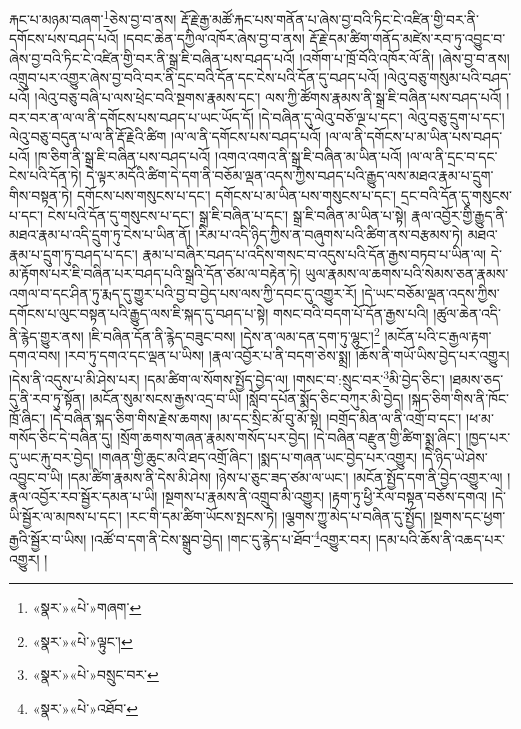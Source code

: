 རྐང་པ་མཉམ་བཞག་\footnote{«སྣར་»«པེ་»གཞག་}ཅེས་བྱ་བ་ནས། རྡོ་རྗེ་རྒྱ་མཚོ་རྐང་པས་གནོན་པ་ཞེས་བྱ་བའི་ཏིང་ངེ་འཛིན་གྱི་བར་ནི་དགོངས་པས་བཤད་པའོ། །དབང་ཆེན་དཀྱིལ་འཁོར་ཞེས་བྱ་བ་ནས། རྡོ་རྗེ་དམ་ཚིག་གནོད་མཛེས་རབ་ཏུ་འབྱུང་བ་ཞེས་བྱ་བའི་ཏིང་ངེ་འཛིན་གྱི་བར་ནི་སྒྲ་ཇི་བཞིན་པས་བཤད་པའོ། །འགོག་པ་ཁྲོ་བོའི་འཁོར་ལོ་ནི། །ཞེས་བྱ་བ་ནས། འགྲུབ་པར་འགྱུར་ཞེས་བྱ་བའི་བར་ནི་དྲང་བའི་དོན་དང་ངེས་པའི་དོན་དུ་བཤད་པའོ། །ལེའུ་བཅུ་གསུམ་པའི་བཤད་པའོ། །ལེའུ་བཅུ་བཞི་པ་ལས་ཕྲེང་བའི་སྔགས་རྣམས་དང་། ལས་ཀྱི་ཚོགས་རྣམས་ནི་སྒྲ་ཇི་བཞིན་པས་བཤད་པའོ། །བར་བར་ན་ལ་ལ་ནི་དགོངས་པས་བཤད་པ་ཡང་ཡོད་དོ། །དེ་བཞིན་དུ་ལེའུ་བཅོ་ལྔ་པ་དང་། ལེའུ་བཅུ་དྲུག་པ་དང་། ལེའུ་བཅུ་བདུན་པ་ལ་ནི་རྡོ་རྗེའི་ཚིག །ལ་ལ་ནི་དགོངས་པས་བཤད་པའོ། །ལ་ལ་ནི་དགོངས་པ་མ་ཡིན་པས་བཤད་པའོ། །ཁ་ཅིག་ནི་སྒྲ་ཇི་བཞིན་པས་བཤད་པའོ། །འགའ་འགའ་ནི་སྒྲ་ཇི་བཞིན་མ་ཡིན་པའོ། །ལ་ལ་ནི་དྲང་བ་དང་ངེས་པའི་དོན་ཏེ། དེ་ལྟར་མདོའི་ཚིག་དེ་དག་ནི་བཅོམ་ལྡན་འདས་ཀྱིས་བཤད་པའི་རྒྱུད་ལས་མཐའ་རྣམ་པ་དྲུག་གིས་བསྟན་ཏེ། དགོངས་པས་གསུངས་པ་དང་། དགོངས་པ་མ་ཡིན་པས་གསུངས་པ་དང་། དྲང་བའི་དོན་དུ་གསུངས་པ་དང་། ངེས་པའི་དོན་དུ་གསུངས་པ་དང་། སྒྲ་ཇི་བཞིན་པ་དང་། སྒྲ་ཇི་བཞིན་མ་ཡིན་པ་སྟེ། རྣལ་འབྱོར་གྱི་རྒྱུད་ནི་མཐའ་རྣམ་པ་འདི་དྲུག་ཏུ་ངེས་པ་ཡིན་ནོ། །རིམ་པ་འདི་ཉིད་ཀྱིས་ན་བཞུགས་པའི་ཚིག་ནས་བརྩམས་ཏེ། མཐའ་རྣམ་པ་དྲུག་ཏུ་བཤད་པ་དང་། རྣམ་པ་བཞིར་བཤད་པ་འདིས་གསང་བ་འདུས་པའི་དོན་རྒྱས་བཏབ་པ་ཡིན་ལ། དེ་མ་རྟོགས་པར་ཇི་བཞིན་པར་བཤད་པའི་སྒྲའི་དོན་ཙམ་ལ་བརྟེན་ཏེ། ཡུལ་རྣམས་ལ་ཆགས་པའི་སེམས་ཅན་རྣམས་འགལ་བ་དང་ཤིན་ཏུ་རྨད་དུ་གྱུར་པའི་བྱ་བ་བྱེད་པས་ལས་ཀྱི་དབང་དུ་འགྱུར་རོ། །དེ་ཡང་བཅོམ་ལྡན་འདས་ཀྱིས་དགོངས་པ་ལུང་བསྟན་པའི་རྒྱུད་ལས་ཇི་སྐད་དུ་བཤད་པ་སྟེ། གསང་བའི་བདག་པོ་དོན་རྒྱས་པའི། །ཚུལ་ཆེན་འདི་ནི་རྙེད་གྱུར་ནས། །ཇི་བཞིན་དོན་ནི་རྙེད་བཟུང་བས། །དེས་ན་ལམ་དན་དག་ཏུ་ལྷུང་།\footnote{«སྣར་»«པེ་»ལྟུང་།} །མངོན་པའི་ང་རྒྱལ་རྟག་དགའ་བས། །རབ་ཏུ་དགའ་དང་ལྡན་པ་ཡིས། །རྣལ་འབྱོར་པ་ནི་བདག་ཅེས་སྨྲ། །ཆོས་ནི་གཡོ་ཡིས་བྱེད་པར་འགྱུར། །དེས་ནི་འདུས་པ་མི་ཤེས་པར། །དམ་ཚིག་ལ་སོགས་སྤྱོད་བྱེད་ལ། །གསང་བ་:སྲུང་བར་\footnote{«སྣར་»«པེ་»བསྲུང་བར་}མི་བྱེད་ཅིང་། །ཐམས་ཅད་དུ་ནི་རབ་ཏུ་སྟོན། །མངོན་སུམ་སངས་རྒྱས་འདྲ་བ་ཡི། །སློབ་དཔོན་སྨོད་ཅིང་བཀུར་མི་བྱེད། །སྐད་ཅིག་གིས་ནི་ཁོང་ཁྲོ་ཞིང་། །དེ་བཞིན་སྐད་ཅིག་གིས་རྗེས་ཆགས། །མ་དང་སྲིང་མོ་བུ་མོ་སྟེ། །བགྲོད་མིན་ལ་ནི་འགྲོ་བ་དང་། །ཕ་མ་གསོད་ཅིང་དེ་བཞིན་དུ། །སྲོག་ཆགས་གཞན་རྣམས་གསོད་པར་བྱེད། །དེ་བཞིན་བརྫུན་གྱི་ཚིག་སྨྲ་ཞིང་། །ཁྱད་པར་དུ་ཡང་རྐུ་བར་བྱེད། །གཞན་གྱི་ཆུང་མའི་ཐད་འགྲོ་ཞིང་། །སྨད་པ་གཞན་ཡང་བྱེད་པར་འགྱུར། །དེ་ཉིད་ཡེ་ཤེས་འབྱུང་བ་ཡི། །དམ་ཚིག་རྣམས་ནི་དེས་མི་ཤེས། །ཉེས་པ་ཅུང་ཟད་ཙམ་ལ་ཡང་། །མངོན་སྤྱོད་དག་ནི་བྱེད་འགྱུར་ལ། །རྣལ་འབྱོར་རབ་སྦྱོར་དམན་པ་ཡི། །སྔགས་པ་རྣམས་ནི་འགྲུབ་མི་འགྱུར། །རྟག་ཏུ་ཕྱི་རོལ་བསྟན་བཅོས་དགའ། །དེ་ཡི་སྦྱོར་ལ་མཁས་པ་དང་། །རང་གི་དམ་ཚིག་ཡོངས་སྤངས་ཏེ། །ལྕགས་ཀྱུ་མེད་པ་བཞིན་དུ་སྤྱོད། །སྔགས་དང་ཕྱག་རྒྱའི་སྦྱོར་བ་ཡིས། །འཚོ་བ་དག་ནི་ངེས་སྒྲུབ་བྱེད། །གང་དུ་རྙེད་པ་ཐོབ་\footnote{«སྣར་»«པེ་»འཐོབ་}འགྱུར་བར། །དམ་པའི་ཆོས་ནི་འཆད་པར་འགྱུར། །
